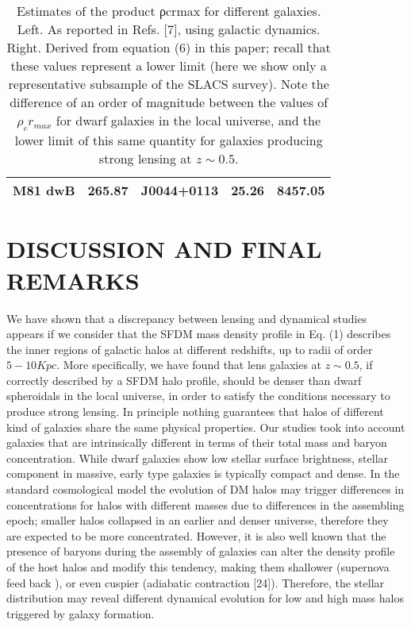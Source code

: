\documentclass[%
 twocolumn,
 amsmath,amssymb,
 aps,
]{revtex4-2}
\begin{document}
\begin{table*}[t]
\begin{tabular}{|c|c|c|c|c|}
M81 dwB    & 265.87                                                 & J0044+0113 & 25.26      & 8457.05                                                \\ \hline
\end{tabular}
\caption{Estimates of the product ρcrmax for different galaxies. Left. As reported in Refs. [7], using galactic dynamics.
Right. Derived from equation (6) in this paper; recall that these values represent a lower limit (here we show only a representative
subsample of the SLACS survey). Note the difference of an order of magnitude between the values of $\rho_{c}r_{max}$ for dwarf galaxies
in the local universe, and the lower limit of this same quantity for galaxies producing strong lensing at $z \sim 0.5.$}
\end{table*}

\section{DISCUSSION AND FINAL REMARKS}
We have shown that a discrepancy between lensing and
dynamical studies appears if we consider that the SFDM
mass density profile in Eq. (1) describes the inner regions
of galactic halos at different redshifts, up to radii of order
$5 − 10 Kpc$. More specifically, we have found that lens
galaxies at $z \sim 0.5$, if correctly described by a SFDM halo
profile, should be denser than dwarf spheroidals in the
local universe, in order to satisfy the conditions necessary
to produce strong lensing.
In principle nothing guarantees that halos of different kind of galaxies share the same physical properties.
Our studies took into account galaxies that are intrinsically different in terms of their total mass and baryon
concentration. While dwarf galaxies show low stellar surface brightness, stellar component in massive, early type
galaxies is typically compact and dense.
In the standard cosmological model the evolution of
DM halos may trigger differences in concentrations for
halos with different masses due to differences in the assembling epoch; smaller halos collapsed in an earlier and
denser universe, therefore they are expected to be more
concentrated. However, it is also well known that the
presence of baryons during the assembly of galaxies can
alter the density profile of the host halos and modify
this tendency, making them shallower (supernova feedback \cite{ceverino}), or even cuspier (adiabatic contraction [24]).
Therefore, the stellar distribution may reveal different
dynamical evolution for low and high mass halos triggered by galaxy formation.
\end{document}
